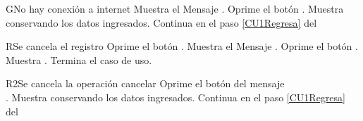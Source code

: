\begin{UCtrayectoriaA}{G}{No hay conexión a internet}
    \UCpaso Muestra el Mensaje \textbf{}.
    \UCpaso[\UCactor] Oprime el botón .
    \UCpaso Muestra  conservando los datos ingresados.
    \UCpaso Continua en el paso \ref{CU1Regresa} del 
\end{UCtrayectoriaA}

\begin{UCtrayectoriaA}{R}{Se cancela el registro}
	\UCpaso[\UCactor] Oprime el botón .
	\UCpaso Muestra el Mensaje \textbf{}.
    \UCpaso[\UCactor] Oprime el botón . 
	\UCpaso Muestra .
	\UCpaso Termina el caso de uso.
\end{UCtrayectoriaA}

\begin{UCtrayectoriaA}{R2}{Se cancela la operación cancelar}
    \UCpaso[\UCactor] Oprime el botón  del mensaje
        \\\textbf{}.
    \UCpaso Muestra  conservando los datos ingresados.
    \UCpaso Continua en el paso \ref{CU1Regresa} del 
\end{UCtrayectoriaA}
